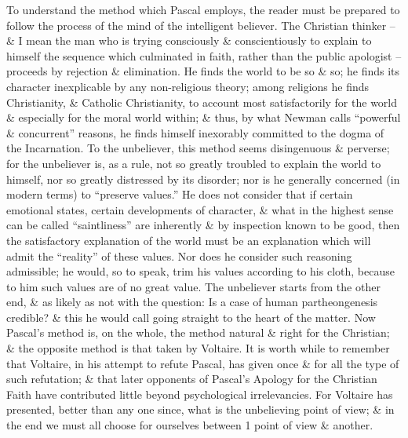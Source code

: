 \documentclass{article}
\begin{document}
\begin{enumerate}
\begin{itemize}
		To understand the method which {\sc Pascal} employs, the reader must be prepared to follow the process of the mind of the intelligent believer. The Christian thinker -- \& I mean the man who is trying consciously \& conscientiously to explain to himself the sequence which culminated in faith, rather than the public apologist -- proceeds by rejection \& elimination. He finds the world to be so \& so; he finds its character inexplicable by any non-religious theory; among religions he finds Christianity, \& Catholic Christianity, to account most satisfactorily for the world \& especially for the moral world within; \& thus, by what {\sc Newman} calls ``powerful \& concurrent'' reasons, he finds himself inexorably committed to the dogma of the Incarnation. To the unbeliever, this method seems disingenuous \& perverse; for the unbeliever is, as a rule, not so greatly troubled to explain the world to himself, nor so greatly distressed by its disorder; nor is he generally concerned (in modern terms) to ``preserve values.'' He does not consider that if certain emotional states, certain developments of character, \& what in the highest sense can be called ``saintliness'' are inherently \& by inspection known to be good, then the satisfactory explanation of the world must be an explanation which will admit the ``reality'' of these values. Nor does he consider such reasoning admissible; he would, so to speak, trim his values according to his cloth, because to him such values are of no great value. The unbeliever starts from the other end, \& as likely as not with the question: Is a case of human partheongenesis credible? \& this he would call going straight to the heart of the matter. Now {\sc Pascal}'s method is, on the whole, the method natural \& right for the Christian; \& the opposite method is that taken by {\sc Voltaire}. It is worth while to remember that {\sc Voltaire}, in his attempt to refute {\sc Pascal}, has given once \& for all the type of such refutation; \& that later opponents of {\sc Pascal}'s Apology for the Christian Faith have contributed little beyond psychological irrelevancies. For {\sc Voltaire} has presented, better than any one since, what is the unbelieving point of view; \& in the end we must all choose for ourselves between 1 point of view \& another.
		

\end{itemize}
\end{enumerate}
\end{document}
